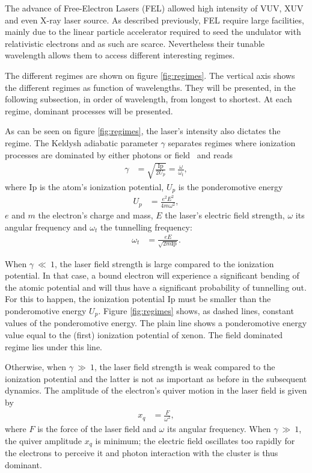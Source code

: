 The advance of Free-Electron Lasers (FEL) allowed high intensity of VUV, XUV and
even X-ray laser source. As described previously, FEL require large facilities,
mainly due to the linear particle accelerator required to seed the undulator
with relativistic electrons and as such are scarce. Nevertheless their
tunable wavelength allows them to access different interesting regimes.

The different regimes are shown on figure \ref{fig:regimes}.
The vertical axis shows the different regimes as
function of wavelengths. They will be presented, in the following subsection,
in order of wavelength, from longest to shortest. At each regime, dominant
processes will be presented.

As can be seen on figure \ref{fig:regimes}, the laser's intensity also dictates
the regime.
The Keldysh adiabatic parameter $\gamma$ separates regimes where ionization
processes are dominated by either photons or field~\cite{Long2010} and reads
\begin{align}
\gamma & = \sqrt{ \frac{\textrm{Ip}}{2 U_p} } = \frac{\omega}{\omega_t},
\end{align}
where Ip is the atom's ionization potential, $U_p$ is the ponderomotive energy
\begin{align}
U_p & = \frac{e^2 E^2}{4 m \omega^2},
\end{align}
$e$ and $m$ the electron's charge and mass, $E$ the laser's electric field
strength, $\omega$ its angular frequency and $\omega_t$ the tunnelling
frequency:
\begin{align}
\omega_t & = \frac{e E}{\sqrt{2 m \textrm{Ip}}}.
\end{align}

When $\gamma~\ll~1$, the laser field strength is large compared to the ionization
potential. In that case, a bound electron will experience a significant bending of the
atomic potential and will thus have a significant probability of tunnelling out.
For this to happen, the ionization potential Ip must be
smaller than the ponderomotive energy $U_p$. Figure \ref{fig:regimes} shows,
as dashed lines, constant values of the ponderomotive energy. The plain line shows
a ponderomotive energy value equal to the (first) ionization potential of xenon.
The field dominated regime lies under this line.

Otherwise, when $\gamma~\gg~1$, the laser field strength is weak compared to
the ionization potential and the latter is not as important as before in the
subsequent dynamics. The amplitude of the electron's quiver motion in the laser
field is given by
\begin{align}
x_q & = \frac{F}{\omega^2},
\label{eqn:quiver}
\end{align}
where $F$ is the force of the laser field and $\omega$ its angular frequency.
When $\gamma~\gg~1$, the quiver amplitude $x_q$ is minimum; the electric field
oscillates too rapidly for the electrons to perceive it and photon interaction with
the cluster is thus dominant.

